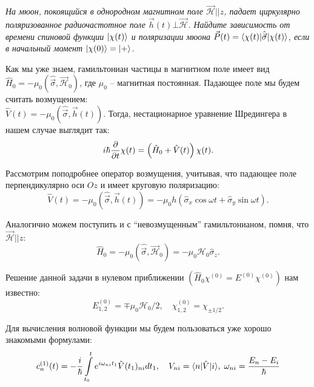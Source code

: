 \begin{exercise}
  \textit{На мюон, покоящийся в однородном магнитном поле $\Vec{\mathcal{H}} ||
      z$, падает циркулярно поляризованное радиочастотное поле
    $\Vec{h}(t)\bot\Vec{\mathcal{H}}$. Найдите зависимость от времени спиновой
    функции $\lvert\chi(t)\rangle$ и поляризации мюона $\Vec{P}(t) =
      \langle\chi(t)\rvert\hat{\Vec{\sigma}}\lvert\chi(t)\rangle$, если в начальный момент
    $\lvert\chi(0)\rangle = \lvert+\rangle$.}
\end{exercise}
Как мы уже знаем, гамильтониан частицы в магнитном поле имеет вид $\hat{H}_0 =
  -\mu_0(\hat{\Vec{\sigma}},\Vec{\mathcal{H}}_0)$, где $\mu_0$ -- магнитная
постоянная. Падающее поле мы будем считать возмущением:
\\$\hat{V}(t)=-\mu_0(\hat{\Vec{\sigma}}, \Vec{h}(t))$. Тогда, нестационарное
  уравнение Шредингера в нашем случае выглядит так:
  \[
  i\hbar\frac{\partial }{\partial t}\chi(t) = \left(\hat{H}_0+\hat{V}(t)\right)\chi(t).
\]

Рассмотрим поподробнее оператор возмущения, учитывая, что падающее поле
перпендикулярно оси $Oz$ и имеет круговую поляризацию:
\[
  \hat{V}(t) = -\mu_0(\hat{\Vec{\sigma}}, \Vec{h}(t)) = -\mu_0 h\left(\hat{\sigma}_x\cos\omega t + \hat{\sigma}_y\sin\omega t\right).
\]

Аналогично можем поступить и с ``невозмущенным'' гамильтонианом, помня, что
$\Vec{\mathcal{H}}||z$:
\[
  \hat{H}_0 = - \mu_0(\hat{\Vec{\sigma}},\Vec{\mathcal{H}}_0) = -\mu_0\mathcal{H}_0\hat{\sigma}_z.
\]

Решение данной задачи в нулевом приближении
$\left(\hat{H}_0\chi^{(0)}=E^{(0)}\chi^{(0)}\right)$ нам известно:
\[E_{1,2}^{(0)}=\mp\mu_0\mathcal{H}_0/2, \quad \chi_{1,2}^{(0)} = \chi_{\pm1/2}.
\]

Для вычисления волновой функции мы будем пользоваться уже хорошо знакомыми
формулами:
\[
  c_n^{(1)}(t) = -\frac{i}{\hbar}\int\limits_{t_0}^{t}e^{i\omega_{ni}t_1}\hat{V}(t_1)_{ni}dt_1, \quad V_{ni} =\langle n\rvert\hat{V}\lvert i\rangle, \; \omega_{ni}=\frac{E_n-E_i}{\hbar}
\]

